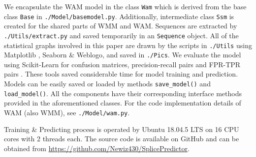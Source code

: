 \documentclass[journal,twoside]{IEEEtran}
\begin{document}
We encapsulate the WAM model in the class \texttt{Wam} which is derived from the base class \texttt{Base} in \texttt{./Model/basemodel.py}. Additionally, intermediate class \texttt{Ssm} is created for the shared parts of WMM and WAM. Sequences are extracted by \texttt{./Utils/extract.py} and saved temporarily in an \texttt{Sequence} object. All of the statistical graphs involved in this paper are drawn by the scripts in \texttt{./Utils} using Matplotlib \cite{Hunter:2007}, Seaborn \cite{Waskom2021} \& Weblogo, and saved in \texttt{./Pics}. We evaluate the model using Scikit-Learn for confusion matrices, precision-recall pairs and FPR-TPR pairs \cite{pedregosa2011scikit}. These tools saved considerable time for model training and prediction. Models can be easily saved or loaded by methods \texttt{save\_model()} and \texttt{load\_model()}. All the components have their corresponding interface methods provided in the aforementioned classes. For the code implementation details of WAM (also WMM), see \texttt{./Model/wam.py}. 

Training \& Predicting process is operated by Ubuntu 18.04.5 LTS on 16 CPU cores with 2 threads each. The source code is available on GitHub and can be obtained from \url{https://github.com/Newiz430/SplicePredictor}. 
\end{document}
